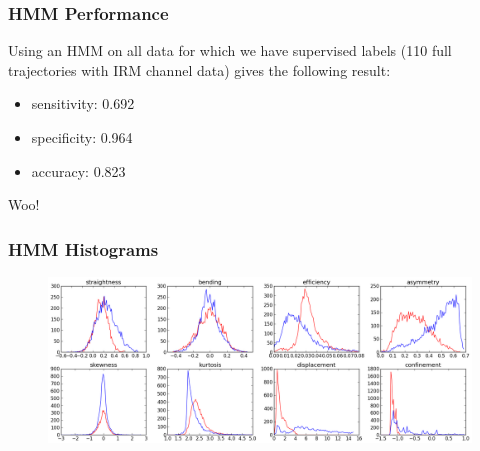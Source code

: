 \documentclass[8pt]{beamer}
\begin{document}
\begin{frame}
  \frametitle{HMM Performance}
  Using an HMM on all data for which we have supervised labels (110 full
  trajectories with IRM channel data) gives the following result:
  \begin{itemize}
  \item sensitivity: 0.692
  \item specificity: 0.964
  \item accuracy: 0.823
  \end{itemize}
  Woo!
\end{frame}

\begin{frame}
  \frametitle{HMM Histograms}
  \begin{figure}[H]\centering
    \includegraphics[width=\textwidth]{../../out/hmm_hist.png}
  \end{figure}
  
\end{frame}
\end{document}
